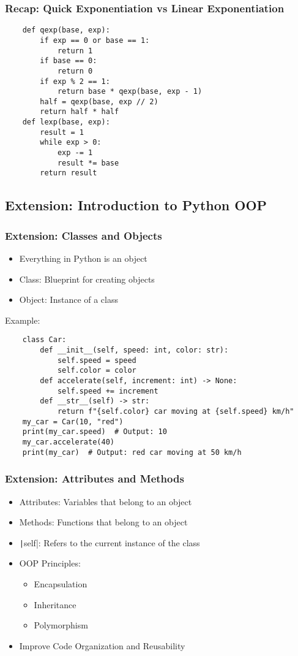 \documentclass{beamer}
\newcommand{\python}[1]{\texttt|#1|}
\begin{document}
\begin{frame}[fragile]
    \frametitle{Recap: Quick Exponentiation vs Linear Exponentiation}
    \begin{verbatim}
    def qexp(base, exp):
        if exp == 0 or base == 1:
            return 1
        if base == 0:
            return 0
        if exp % 2 == 1:
            return base * qexp(base, exp - 1)
        half = qexp(base, exp // 2)
        return half * half
    def lexp(base, exp):
        result = 1
        while exp > 0:
            exp -= 1
            result *= base
        return result
              \end{verbatim}
\end{frame}

\subsection{Extension: Introduction to Python OOP}
\begin{frame}[fragile]
    \frametitle{Extension: Classes and Objects}
    \begin{itemize}
        \item Everything in Python is an object
        \item Class: Blueprint for creating objects
        \item Object: Instance of a class
    \end{itemize}

    Example:
    \begin{verbatim}
    class Car:
        def __init__(self, speed: int, color: str):
            self.speed = speed
            self.color = color
        def accelerate(self, increment: int) -> None:
            self.speed += increment        
        def __str__(self) -> str:
            return f"{self.color} car moving at {self.speed} km/h" 
    my_car = Car(10, "red")
    print(my_car.speed)  # Output: 10
    my_car.accelerate(40)
    print(my_car)  # Output: red car moving at 50 km/h
    \end{verbatim}
\end{frame}

\begin{frame}
    \frametitle{Extension: Attributes and Methods}
    \begin{itemize}
        \item Attributes: Variables that belong to an object
        \item Methods: Functions that belong to an object
        \item \python{self}: Refers to the current instance of the class
        \item OOP Principles:
              \begin{itemize}
                  \item Encapsulation
                  \item Inheritance
                  \item Polymorphism
              \end{itemize}
        \item Improve Code Organization and Reusability
    \end{itemize}
\end{frame}
\end{document}
